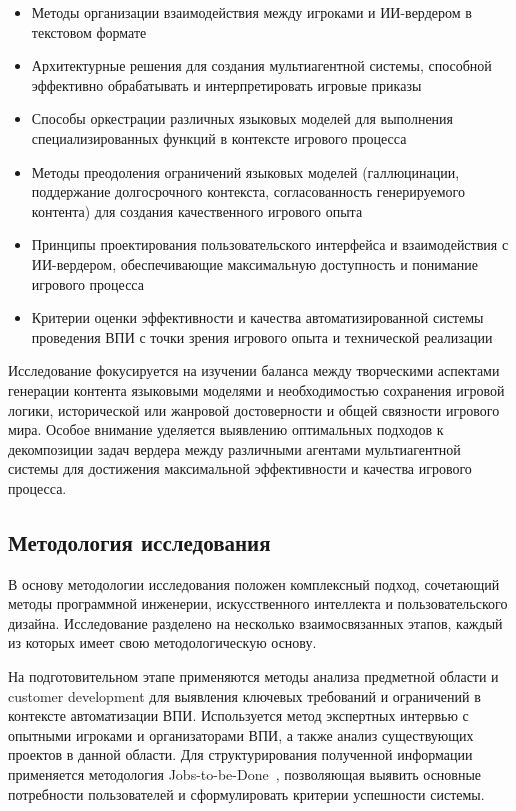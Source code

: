 \begin{itemize}
    \item Методы организации взаимодействия между игроками и ИИ-вердером в текстовом формате

    \item Архитектурные решения для создания мультиагентной системы, способной эффективно обрабатывать и интерпретировать игровые приказы

    \item Способы оркестрации различных языковых моделей для выполнения специализированных функций в контексте игрового процесса

    \item Методы преодоления ограничений языковых моделей (галлюцинации, поддержание долгосрочного контекста, согласованность генерируемого контента) для создания качественного игрового опыта

    \item Принципы проектирования пользовательского интерфейса и взаимодействия с ИИ-вердером, обеспечивающие максимальную доступность и понимание игрового процесса

    \item Критерии оценки эффективности и качества автоматизированной системы проведения ВПИ с точки зрения игрового опыта и технической реализации
\end{itemize}

Исследование фокусируется на изучении баланса между творческими аспектами генерации контента языковыми моделями и необходимостью сохранения игровой логики, исторической или жанровой достоверности и общей связности игрового мира. Особое внимание уделяется выявлению оптимальных подходов к декомпозиции задач вердера между различными агентами мультиагентной системы для достижения максимальной эффективности и качества игрового процесса.

\subsection*{Методология исследования}

В основу методологии исследования положен комплексный подход, сочетающий методы программной инженерии, искусственного интеллекта и пользовательского дизайна. Исследование разделено на несколько взаимосвязанных этапов, каждый из которых имеет свою методологическую основу.

На подготовительном этапе применяются методы анализа предметной области и customer development для выявления ключевых требований и ограничений в контексте автоматизации ВПИ. Используется метод экспертных интервью с опытными игроками и организаторами ВПИ, а также анализ существующих проектов в данной области. Для структурирования полученной информации применяется методология Jobs-to-be-Done~\cite{christensen2016knowing}, позволяющая выявить основные потребности пользователей и сформулировать критерии успешности системы.

